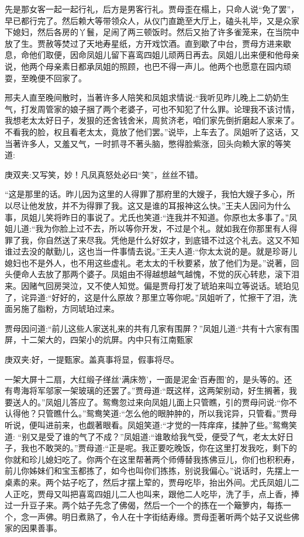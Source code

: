 \begin{parag}
    先是那女客一起一起行礼，后方是男客行礼。贾母歪在榻上，只命人说“免了罢”，早已都行完了。然后赖大等带领众人，从仪门直跪至大厅上，磕头礼毕，又是众家下媳妇，然后各房的丫鬟，足闹了两三顿饭时。然后又抬了许多雀笼来，在当院中放了生。贾赦等焚过了天地寿星纸，方开戏饮酒。直到歇了中台，贾母方进来歇息，命他们取便，因命凤姐儿留下喜鸾四姐儿顽两日再去。凤姐儿出来便和他母亲说，他两个母亲素日都承凤姐的照顾，也巴不得一声儿。他两个也愿意在园内顽耍，至晚便不回家了。
\end{parag}


\begin{parag}
    邢夫人直至晚间散时，当著许多人陪笑和凤姐求情说:“我听见昨儿晚上二奶奶生气，打发周管家的娘子捆了两个老婆子，可也不知犯了什么罪。论理我不该讨情，我想老太太好日子，发狠的还舍钱舍米，周贫济老，咱们家先倒折磨起人家来了。不看我的脸，权且看老太太，竟放了他们罢。”说毕，上车去了。凤姐听了这话，又当著许多人，又羞又气，一时抓寻不著头脑，憋得脸紫涨，回头向赖大家的等笑道:\begin{note}庚双夹:又写笑，妙！凡凤真怒处必曰“笑”，丝丝不错。\end{note}“这是那里的话。昨儿因为这里的人得罪了那府里的大嫂子，我怕大嫂子多心，所以尽让他发放，并不为得罪了我。这又是谁的耳报神这么快。”王夫人因问为什么事，凤姐儿笑将昨日的事说了。尤氏也笑道:“连我并不知道。你原也太多事了。”凤姐儿道:“我为你脸上过不去，所以等你开发，不过是个礼。就如我在你那里有人得罪了我，你自然送了来尽我。凭他是什么好奴才，到底错不过这个礼去。这又不知谁过去没的献勤儿，这也当一件事情去说。”王夫人道:“你太太说的是。就是珍哥儿媳妇也不是外人，也不用这些虚礼。老太太的千秋要紧，放了他们为是。”说著，回头便命人去放了那两个婆子。凤姐由不得越想越气越愧，不觉的灰心转悲，滚下泪来。因赌气回房哭泣，又不使人知觉。偏是贾母打发了琥珀来叫立等说话。琥珀见了，诧异道:“好好的，这是什么原故？那里立等你呢。”凤姐听了，忙擦干了泪，洗面另施了脂粉，方同琥珀过来。
\end{parag}


\begin{parag}
    贾母因问道:“前儿这些人家送礼来的共有几家有围屏？”凤姐儿道:“共有十六家有围屏，十二架大的，四架小的炕屏。内中只有江南甄家\begin{note}庚双夹:好，一提甄家。盖真事将显，假事将尽。\end{note}一架大屏十二扇，大红缎子缂丝‘满床笏’，一面是泥金‘百寿图’的，是头等的。还有粤海将军邬家一架玻璃的还罢了。”贾母道:“既这样，这两架别动，好生搁著，我要送人的。”凤姐儿答应了。鸳鸯忽过来向凤姐儿面上只管瞧，引的贾母问说:“你不认得他？只管瞧什么。”鸳鸯笑道:“怎么他的眼肿肿的，所以我诧异，只管看。”贾母听说，便叫进前来，也觑著眼看。凤姐笑道:“才觉的一阵痒痒，揉肿了些。”鸳鸯笑道: “别又是受了谁的气了不成？”凤姐道:“谁敢给我气受，便受了气，老太太好日子，我也不敢哭的。”贾母道:“正是呢。我正要吃晚饭，你在这里打发我吃，剩下的你就和珍儿媳妇吃了。你两个在这里帮著两个师傅替我拣佛豆儿，你们也积积寿，前儿你姊妹们和宝玉都拣了，如今也叫你们拣拣，别说我偏心。”说话时，先摆上一桌素的来。两个姑子吃了，然后才摆上荤的，贾母吃毕，抬出外间。尤氏凤姐儿二人正吃，贾母又叫把喜鸾四姐儿二人也叫来，跟他二人吃毕，洗了手，点上香，捧过一升豆子来。两个姑子先念了佛偈，然后一个一个的拣在一个簸箩内，每拣一个，念一声佛。明日煮熟了，令人在十字街结寿缘。贾母歪著听两个姑子又说些佛家的因果善事。
\end{parag}


